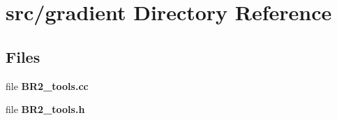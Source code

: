 \section{src/gradient Directory Reference}
\label{dir_3f060cf75ae5580dac0c32dc87b0bce8}
\subsection*{Files}
\begin{DoxyCompactItemize}
\item 
file {\bf B\-R2\-\_\-tools.\-cc}
\item 
file {\bf B\-R2\-\_\-tools.\-h}
\end{DoxyCompactItemize}

